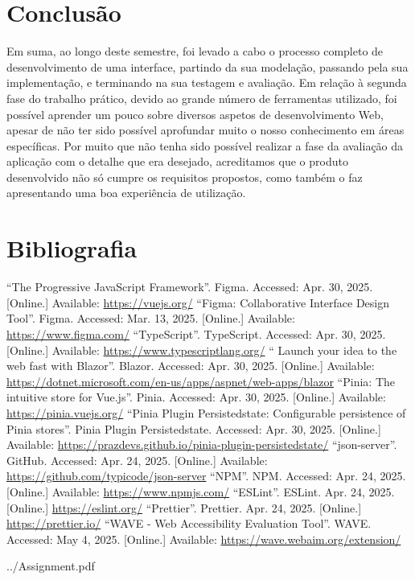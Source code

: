 \documentclass[12pt, a4paper]{article}
\begin{document}
\section{Conclusão}

Em suma, ao longo deste semestre, foi levado a cabo o processo completo de desenvolvimento de uma
interface, partindo da sua modelação, passando pela sua implementação, e terminando na sua testagem
e avaliação. Em relação à segunda fase do trabalho prático, devido ao grande número de ferramentas
utilizado, foi possível aprender um pouco sobre diversos aspetos de desenvolvimento Web, apesar de
não ter sido possível aprofundar muito o nosso conhecimento em áreas específicas. Por muito que não
tenha sido possível realizar a fase da avaliação da aplicação com o detalhe que era desejado,
acreditamos que o produto desenvolvido não só cumpre os requisitos propostos, como também o faz
apresentando uma boa experiência de utilização.

\begingroup
\section{Bibliografia}
\renewcommand{\section}[2]{}

\begin{thebibliography}{9}
        ``The Progressive JavaScript Framework''. Figma. Accessed: Apr. 30, 2025. [Online.]
        Available: \url{https://vuejs.org/}
        ``Figma: Collaborative Interface Design Tool''. Figma. Accessed: Mar. 13, 2025. [Online.]
        Available: \url{https://www.figma.com/}
        ``TypeScript''. TypeScript. Accessed: Apr. 30, 2025. [Online.] Available:
        \url{https://www.typescriptlang.org/}
        `` Launch your idea to the web fast with Blazor''. Blazor. Accessed: Apr. 30, 2025.
        [Online.] Available: \url{https://dotnet.microsoft.com/en-us/apps/aspnet/web-apps/blazor}
        ``Pinia: The intuitive store for Vue.js''. Pinia. Accessed: Apr. 30, 2025. [Online.]
        Available: \url{https://pinia.vuejs.org/}
        ``Pinia Plugin Persistedstate: Configurable persistence of Pinia stores''.
        Pinia Plugin Persistedstate. Accessed: Apr. 30, 2025. [Online.] Available:
        \url{https://prazdevs.github.io/pinia-plugin-persistedstate/}
        ``json-server''. GitHub. Accessed: Apr. 24, 2025. [Online.] Available:
        \url{https://github.com/typicode/json-server}
        ``NPM''. NPM. Accessed: Apr. 24, 2025. [Online.] Available: \url{https://www.npmjs.com/}
        ``ESLint''. ESLint. Apr. 24, 2025. [Online.] \url{https://eslint.org/}
        ``Prettier''. Prettier. Apr. 24, 2025. [Online.] \url{https://prettier.io/}
        ``WAVE - Web Accessibility Evaluation Tool''. WAVE. Accessed: May 4, 2025. [Online.]
        Available: \url{https://wave.webaim.org/extension/}
\end{thebibliography}
\endgroup


    {../Assignment.pdf}

\end{document}
